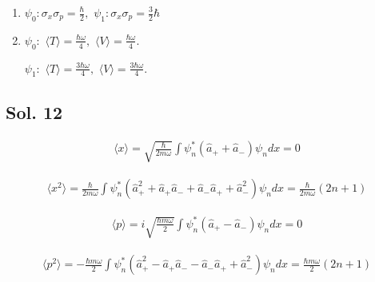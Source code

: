 \begin{enumerate}
\begin{align*}
    \langle
     p^2
     \rangle
     =& -\hbar^2\int (\frac{m\omega}{\pi\hbar})^{1/4}
     \sqrt{\frac{2m\omega}{\hbar}}x
     e^{-\frac{m\omega}{2\hbar}x^2}
     \frac{\partial^2}{\partial x^2}
     (\frac{m\omega}{\pi\hbar})^{1/4}
     \sqrt{\frac{2m\omega}{\hbar}}x
     e^{-\frac{m\omega}{2\hbar}x^2}dx \\
     =&  -\hbar^2\int (\frac{m\omega}{\pi\hbar})^{1/4}
     \sqrt{\frac{2m\omega}{\hbar}}x
     e^{-\frac{m\omega}{2\hbar}x^2}
     \frac{\sqrt{2} \, m{\omega} \cdot \left(\frac{m{\omega}}{\hbar}\right)^{\frac{3}{4}} \, x \left(m{\omega}x^{2} - 3\hbar\right) \mathrm{e}^{-\frac{m{\omega}x^{2}}{2\hbar}}}{\sqrt[4]{\pi} \, \hbar^{2}}
     dx
     = \frac{3\hbar m \omega}{2}
\end{align*}
\item $\psi_0: \sigma_x\sigma_p = \frac{\hbar}{2},$ $\psi_1:\sigma_x\sigma_p = \frac{3}{2}\hbar$
\item $\psi_0:$ $\langle T\rangle = \frac{\hbar \omega}{4},$ 
$\langle V\rangle = \frac{\hbar \omega}{4}.$ 

$\psi_1:$ $\langle T\rangle = \frac{3\hbar \omega}{4},$ 
$\langle V\rangle = \frac{3\hbar \omega}{4}.$ 
\end{enumerate}


\subsection*{Sol. 12}
\begin{align*}
    \langle
    x
    \rangle = 
    \sqrt{\frac{\hbar}{2m\omega}}
    \int \psi^*_n(\hat{a}_+ + \hat{a}_-)\psi_ndx = 0
\end{align*}

\begin{align*}
    \langle
    x^2
    \rangle = 
    \frac{\hbar}{2m\omega}
    \int \psi^*_n(\hat{a}_+^2 + \hat{a}_+\hat{a}_-
    + \hat{a}_-\hat{a}_+
    +\hat{a}_-^2)\psi_ndx = 
    \frac{\hbar}{2m\omega}(2n+1)
\end{align*}

\begin{align*}
    \langle
    p
    \rangle = 
    i\sqrt{\frac{\hbar m\omega}{2}}
    \int \psi^*_n(\hat{a}_+ - \hat{a}_-)\psi_ndx = 0
\end{align*}

\begin{align*}
    \langle
    p^2
    \rangle = 
    -\frac{\hbar m\omega}{2}
    \int \psi^*_n(\hat{a}_+^2 
    - \hat{a}_+\hat{a}_-
    - \hat{a}_-\hat{a}_+
    +\hat{a}_-^2)\psi_ndx = 
    \frac{\hbar m\omega}{2}(2n+1)
\end{align*}

